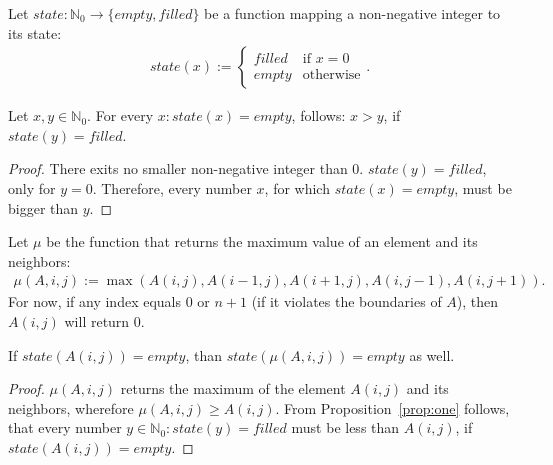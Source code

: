 \documentclass[twoside,11pt]{article}
\begin{document}
Let $state : \mathbb{N}_0 \rightarrow \{empty,filled\}$ be
a function mapping a non-negative integer to its state:
\begin{align*}
  state(x) := \begin{cases}
    filled &\text{if } x = 0 \\
    empty  &\text{otherwise}
  \end{cases}.
\end{align*}

\begin{proposition}
  \label{prop:one}
  Let $x, y \in \mathbb{N}_0$.
  For every $x: state(x) = empty$, follows: $x > y$, if
  $state(y) = filled$.
\end{proposition}

\begin{proof}
  There exits no smaller non-negative integer than $0$.
  $state(y) = filled$, only for $y = 0$. Therefore, every
  number $x$, for which $state(x) = empty$, must be bigger
  than $y$.
\end{proof}

Let $\mu$ be the function that returns the maximum value
of an element and its neighbors:
\begin{align*}
  \mu(A, i, j) := \max(A(i,j), A(i-1,j), A(i+1,j),
                       A(i,j-1), A(i,j+1)).
\end{align*}
For now, if any index equals $0$ or $n + 1$ (if it violates
the boundaries of $A$), then $A(i, j)$ will return $0$.

\begin{proposition}
  \label{prop:two}
  If $state(A(i, j)) = empty$, than
  $state(\mu(A, i, j)) = empty$ as well.
\end{proposition}

\begin{proof}
  $\mu(A, i, j)$ returns the maximum of the element
  $A(i, j)$ and its neighbors, wherefore $\mu(A, i, j) \geq
  A(i, j)$.
  From Proposition~\ref{prop:one} follows, that every
  number $y \in \mathbb{N}_0: state(y) = filled$ must be
  less than $A(i, j)$, if $state(A(i,j)) = empty$.
\end{proof}
\end{document}
